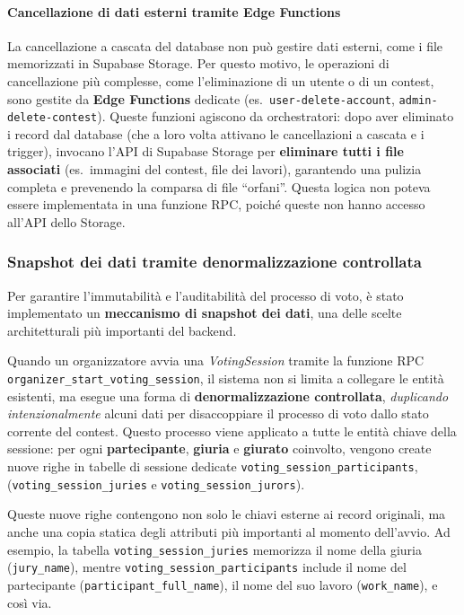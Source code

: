 \paragraph{Cancellazione di dati esterni tramite Edge Functions}
La cancellazione a cascata del database non può gestire dati esterni, come i file memorizzati in Supabase Storage.
Per questo motivo, le operazioni di cancellazione più complesse, come l'eliminazione di un utente o di un contest, sono gestite da \textbf{Edge Functions} dedicate (es.\ \texttt{user-delete-account}, \texttt{admin-delete-contest}). Queste funzioni agiscono da orchestratori: dopo aver eliminato i record dal database (che a loro volta attivano le cancellazioni a cascata e i trigger), invocano l'API di Supabase Storage per \textbf{eliminare tutti i file associati} (es.\ immagini del contest, file dei lavori), garantendo una pulizia completa e prevenendo la comparsa di file ``orfani''.
Questa logica non poteva essere implementata in una funzione RPC, poiché queste non hanno accesso all'API dello Storage.

\subsubsection{Snapshot dei dati tramite denormalizzazione controllata}
Per garantire l'immutabilità e l'auditabilità del processo di voto, è stato implementato un \textbf{meccanismo di snapshot dei dati}, una delle scelte architetturali più importanti del backend.

Quando un organizzatore avvia una \emph{VotingSession} tramite la funzione RPC \texttt{organizer\_start\_voting\_session}, il sistema non si limita a collegare le entità esistenti, ma esegue una forma di \textbf{denormalizzazione controllata}, \emph{duplicando intenzionalmente} alcuni dati per disaccoppiare il processo di voto dallo stato corrente del contest.
Questo processo viene applicato a tutte le entità chiave della sessione: per ogni \textbf{partecipante}, \textbf{giuria} e \textbf{giurato} coinvolto, vengono create nuove righe in tabelle di sessione dedicate \texttt{voting\_session\_participants}, (\texttt{voting\_session\_juries} e \texttt{voting\_session\_jurors}).

Queste nuove righe contengono non solo le chiavi esterne ai record originali, ma anche una copia statica degli attributi più importanti al momento dell'avvio.
Ad esempio, la tabella \texttt{voting\_session\_juries} memorizza il nome della giuria (\texttt{jury\_name}), mentre \texttt{voting\_session\_participants} include il nome del partecipante (\texttt{participant\_full\_name}), il nome del suo lavoro (\texttt{work\_name}), e così via.


